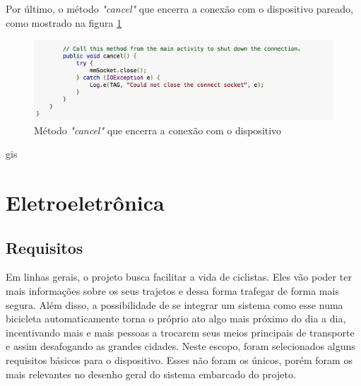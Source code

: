 Por último, o método \textit{"cancel"} que encerra a conexão com o dispositivo pareado, como mostrado na figura \ref{img:trecho5}

\graphicspath{{figuras/}}
  \begin{figure}[!htb]
  \centering
  \includegraphics[scale=0.80]{cancel_method}
  \caption{Método \textit{"cancel"} que encerra a conexão com o dispositivo}
  \label{img:trecho5}
  \end{figure}  
  
gis  \section{Eletroeletrônica}
	
	\subsection{Requisitos}
	Em linhas gerais, o projeto busca facilitar a vida de ciclistas. Eles vão poder ter mais informações sobre os seus trajetos e dessa forma trafegar de forma mais segura. Além disso, a possibilidade de se integrar um sistema como esse numa bicicleta automaticamente torna o próprio ato algo mais próximo do dia a dia, incentivando mais e mais pessoas a trocarem seus meios principais de transporte e assim desafogando as grandes cidades. 
	Neste escopo, foram selecionados alguns requisitos básicos para o dispositivo. Esses não foram os únicos, porém foram os mais relevantes no desenho geral do sistema embarcado do projeto.
	

 
